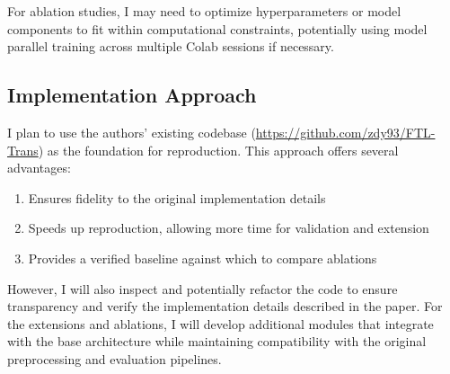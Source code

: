 \documentclass[10pt,letterpaper,twocolumn]{article}
\begin{document}
For ablation studies, I may need to optimize hyperparameters or model components to fit within computational constraints, potentially using model parallel training across multiple Colab sessions if necessary.

\subsection{Implementation Approach}

I plan to use the authors' existing codebase (\url{https://github.com/zdy93/FTL-Trans}) as the foundation for reproduction. This approach offers several advantages:

\begin{enumerate}[leftmargin=*]
    \item Ensures fidelity to the original implementation details
    \item Speeds up reproduction, allowing more time for validation and extension
    \item Provides a verified baseline against which to compare ablations
\end{enumerate}

However, I will also inspect and potentially refactor the code to ensure transparency and verify the implementation details described in the paper. For the extensions and ablations, I will develop additional modules that integrate with the base architecture while maintaining compatibility with the original preprocessing and evaluation pipelines.



\end{document}
